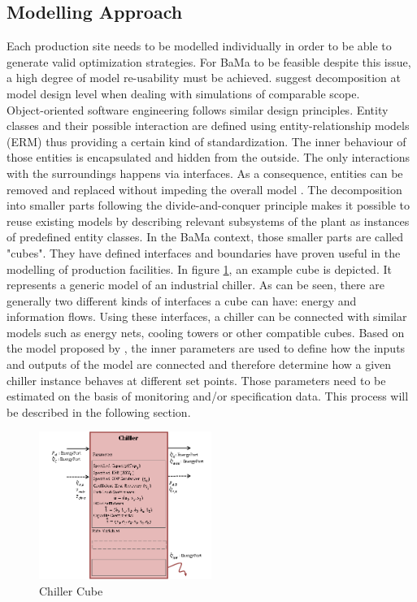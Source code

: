 \documentclass[3p,times,procedia,twocolumn,twoside]{elsarticle}
\begin{document}
\subsection{Modelling Approach}
Each production site needs to be modelled individually in order to be able to generate valid optimization strategies. For BaMa to be feasible despite this issue, a high degree of model re-usability must be achieved. \cite{Balci2012,Setavoraphan2008} suggest decomposition at model design level when dealing with simulations of comparable scope.\\
Object-oriented software engineering follows similar design principles. Entity classes and their possible interaction are defined using entity-relationship models (ERM) thus providing a certain kind of standardization. The inner behaviour of those entities is encapsulated and hidden from the outside. The only interactions with the surroundings happens via interfaces. As a consequence, entities can be removed and replaced without impeding  the overall model \cite{Schatten2010}.
The decomposition into smaller parts following the divide-and-conquer principle makes it possible to reuse existing models by describing relevant subsystems of the plant as instances of predefined entity classes. In the BaMa context, those smaller parts are called "cubes". They have defined interfaces and boundaries have proven useful in the modelling of production facilities.
In figure \ref{FIG_Cube}, an example cube is depicted. It represents a generic model of an industrial chiller. As can be seen, there are generally two different kinds of interfaces a cube can have: energy and information flows. Using these interfaces, a chiller can be connected with similar models such as energy nets, cooling towers or other compatible cubes. Based on the model proposed by \cite{Hydeman2002}, the inner parameters are used to define how the inputs and outputs of the model are connected and therefore determine how a given chiller instance behaves at different set points. Those parameters need to be estimated on the basis of monitoring and/or specification data. This process will be described in the following section.
\begin{figure}
	\includegraphics[width=0.5\textwidth]{figures/Chiller_Cube}
	\caption{Chiller Cube}
	\label{FIG_Cube}
\end{figure}
\end{document}
